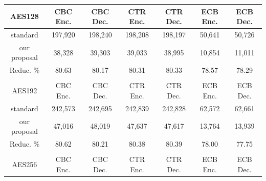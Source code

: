 \begin{table}[tp]
    \begin{tabular}{ccccccc}
    \rowcolor[HTML]{C0C0C0} 
    AES128                               & CBC Enc.             & CBC Dec.             & CTR Enc.             & CTR Dec.             & ECB Enc.             & ECB Dec.             \\ \hline
    \cellcolor[HTML]{EFEFEF}standard     & 197,920              & 198,240              & 198,208              & 198,197              & 50,641               & 50,726               \\
    \cellcolor[HTML]{EFEFEF}our proposal & 38,328               & 39,303               & 39,033               & 38,995               & 10,854               & 11,011               \\
    \cellcolor[HTML]{EFEFEF}Reduc. \%    & 80.63                & 80.17                & 80.31                & 80.33                & 78.57                & 78.29                \\
    \multicolumn{1}{l}{}                 & \multicolumn{1}{l}{} & \multicolumn{1}{l}{} & \multicolumn{1}{l}{} & \multicolumn{1}{l}{} & \multicolumn{1}{l}{} & \multicolumn{1}{l}{} \\
    \cellcolor[HTML]{C0C0C0}AES192       & CBC Enc.             & CBC Dec.             & CTR Enc.             & CTR Dec.             & ECB Enc.             & ECB Dec.             \\ \hline
    \cellcolor[HTML]{EFEFEF}standard     & 242,573              & 242,695              & 242,839              & 242,828              & 62,572               & 62,661               \\
    \cellcolor[HTML]{EFEFEF}our proposal & 47,016               & 48,019               & 47,637               & 47,617               & 13,764               & 13,939               \\
    \cellcolor[HTML]{EFEFEF}Reduc. \%    & 80.62                & 80.21                & 80.38                & 80.39                & 78.00                & 77.75                \\
    \multicolumn{1}{l}{}                 & \multicolumn{1}{l}{} & \multicolumn{1}{l}{} & \multicolumn{1}{l}{} & \multicolumn{1}{l}{} & \multicolumn{1}{l}{} & \multicolumn{1}{l}{} \\
    \cellcolor[HTML]{C0C0C0}AES256       & CBC Enc.             & CBC Dec.             & CTR Enc.             & CTR Dec.             & ECB Enc.             & ECB Dec.             \\ \hline

\end{tabular}
\end{table}
